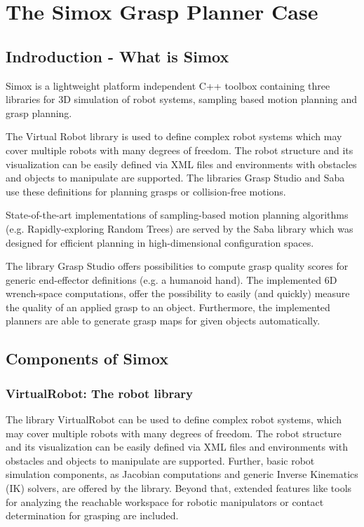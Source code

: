 \section{The Simox Grasp Planner Case}
\subsection{Indroduction - What is Simox}
Simox is a lightweight platform independent C++ toolbox containing three libraries for 3D simulation of robot systems, sampling based motion planning and grasp planning. \par The Virtual Robot library is used to define complex robot systems which may cover multiple robots with many degrees of freedom. The robot structure and its visualization can be easily defined via XML files and environments with obstacles and objects to manipulate are supported. The libraries Grasp Studio and Saba use these definitions for planning grasps or collision-free motions.\par State-of-the-art implementations of sampling-based motion planning algorithms (e.g. Rapidly-exploring Random Trees) are served by the Saba library which was designed for efficient planning in high-dimensional configuration spaces. \par The library Grasp Studio offers possibilities to compute grasp quality scores for generic end-effector definitions (e.g. a humanoid hand). The implemented 6D wrench-space computations, offer the possibility to easily (and quickly) measure the quality of an applied grasp to an object. Furthermore, the implemented planners are able to generate grasp maps for given objects automatically.
\subsection{Components of Simox}
\subsubsection{VirtualRobot: The robot library}
The library VirtualRobot can be used to define complex robot systems, which may cover multiple robots with many degrees of freedom. The robot structure and its visualization can be easily defined via XML files and environments with obstacles and objects to manipulate are supported. Further, basic robot simulation components, as Jacobian computations and generic Inverse Kinematics (IK) solvers, are offered by the library. Beyond that, extended features like tools for analyzing the reachable workspace for robotic manipulators or contact determination for grasping are included. 
